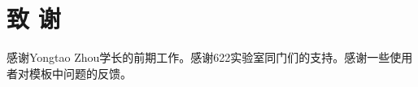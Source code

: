 \chapter*{致\texorpdfstring{\qquad}{} 谢}
\thispagestyle{main}
感谢Yongtao Zhou学长的前期工作。感谢622实验室同门们的支持。感谢一些使用者对模板中问题的反馈。
